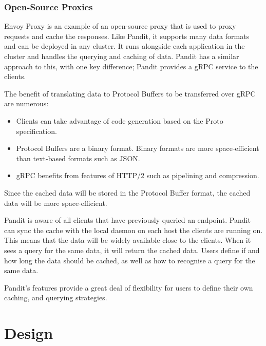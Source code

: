 \documentclass[a4paper,12pt]{report}
\begin{document}
\subsection{Open-Source Proxies}
Envoy Proxy \cite{envoy} is an example of an open-source proxy that is used to proxy requests and cache the responses.
Like Pandit, it supports many data formats and can be deployed in any cluster.
It runs alongside each application in the cluster and handles the querying and caching of data.
Pandit has a similar approach to this, with one key difference; Pandit provides a gRPC service to the clients.

The benefit of translating data to Protocol Buffers to be transferred over gRPC are numerous:
\begin{itemize}
    \item Clients can take advantage of code generation based on the Proto specification. \cite{codegen}
    \item Protocol Buffers are a binary format. Binary formats are more space-efficient than text-based formats such as JSON. \cite{encoding}
    \item gRPC benefits from features of HTTP/2 such as pipelining and compression. \cite{http2}
\end{itemize}

Since the cached data will be stored in the Protocol Buffer format, the cached data will be more space-efficient.

Pandit is aware of all clients that have previously queried an endpoint. Pandit can sync the cache with the local daemon on each host the
clients are running on.
This means that the data will be widely available close to the clients. When it sees a query for the same data, it will return the cached data.
Users define if and how long the data should be cached, as well as how to recognise a query for the same data.

Pandit's features provide a great deal of flexibility for users to define their own caching, and querying strategies.


\chapter{Design}
\end{document}
